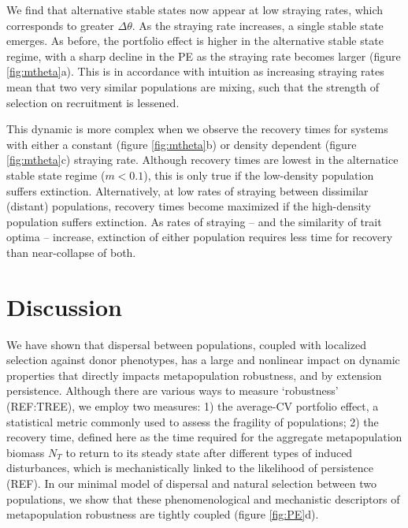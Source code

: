 \documentclass[twocolumn,preprintnumbers,amsmath,amssymb,superscriptaddress]{revtex4}
\begin{document}
We find that alternative stable states now appear at low straying rates, which corresponds to greater $\Delta\theta$.
As the straying rate increases, a single stable state emerges.
As before, the portfolio effect is higher in the alternative stable state regime, with a sharp decline in the PE as the straying rate becomes larger (figure \ref{fig:mtheta}a).
This is in accordance with intuition as increasing straying rates mean that two very similar populations are mixing, such that the strength of selection on recruitment is lessened.

This dynamic is more complex when we observe the recovery times for systems with either a constant (figure \ref{fig:mtheta}b) or density dependent (figure \ref{fig:mtheta}c) straying rate.
Although recovery times are lowest in the alternatice stable state regime ($m<0.1$), this is only true if the low-density population suffers extinction.
Alternatively, at low rates of straying between dissimilar (distant) populations, recovery times become maximized if the high-density population suffers extinction.
As rates of straying -- and the similarity of trait optima -- increase, extinction of either population requires less time for recovery than near-collapse of both.







\section{Discussion}

We have shown that dispersal between populations, coupled with localized selection against donor phenotypes, has a large and nonlinear impact on dynamic properties that directly impacts metapopulation robustness, and by extension persistence.
Although there are various ways to measure `robustness' (REF:TREE), we employ two measures: 
1) the average-CV portfolio effect, a statistical metric commonly used to assess the fragility of populations; 
2) the recovery time, defined here as the time required for the aggregate metapopulation biomass $N_T$ to return to its steady state after different types of induced disturbances, which is mechanistically linked to the likelihood of persistence (REF).
In our minimal model of dispersal and natural selection between two populations, we show that these phenomenological and mechanistic descriptors of metapopulation robustness are tightly coupled (figure \ref{fig:PE}d).
\end{document}
